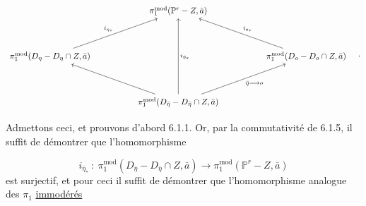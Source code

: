 \begin{equation}\notag
\begin{tikzcd}[column sep=huge, row sep=huge]
 {} & \pi_1^{\mathrm{mod}}(\mathbb{P}^r-Z,\bar{a}) & {} \\
\pi_1^{\mathrm{mod}}(D_{\eta} - D_{\eta} \cap Z,\bar{a}) \arrow[ur, "i_{\eta_*}"] & {} & \pi_1^{\mathrm{mod}}(D_o - D_o \cap Z,\bar{a}) \arrow[ul, "i_{o_*}"'] \\
 {} & \pi_1^{\mathrm{mod}}(D_{\bar{\eta}} - D_{\bar{\eta}} \cap Z,\bar{a}) \arrow[uu, "i_{\bar{\eta}_*}"'] \arrow[ul] \arrow[ur, "\bar{\eta} \longrightarrow o"'] &
{} \end{tikzcd} \quad .
\end{equation}


Admettons ceci, et prouvons d'abord 6.1.1. Or, par la commutativité de 6.1.5, il suffit de démontrer que l'homomorphisme

\begin{equation*}
i_{\bar{\eta}_*} \ : \ \pi_1^{\mathrm{mod}}(D_{\bar{\eta}} - D_{\bar{\eta}} \cap Z, \bar{a}) \longrightarrow \pi_1^{\mathrm{mod}}(\mathbb{P}^r - Z, \bar{a})
\end{equation*}
est surjectif, et pour ceci il suffit de démontrer que l'homomorphisme analogue des $\pi_1$ \underline{immodérés}

